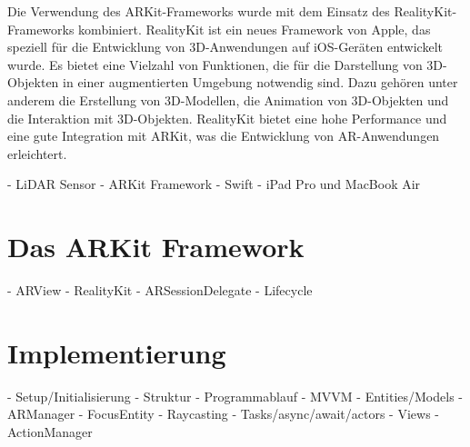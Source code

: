 Die Verwendung des ARKit-Frameworks wurde mit dem Einsatz des RealityKit-Frameworks kombiniert. RealityKit ist ein neues Framework von Apple, das speziell für die Entwicklung von 3D-Anwendungen auf iOS-Geräten entwickelt wurde. Es bietet eine Vielzahl von Funktionen, die für die Darstellung von 3D-Objekten in einer augmentierten Umgebung notwendig sind. Dazu gehören unter anderem die Erstellung von 3D-Modellen, die Animation von 3D-Objekten und die Interaktion mit 3D-Objekten. RealityKit bietet eine hohe Performance und eine gute Integration mit ARKit, was die Entwicklung von AR-Anwendungen erleichtert.

- LiDAR Sensor
- ARKit Framework
- Swift
- iPad Pro und MacBook Air

\section{Das ARKit Framework}
- ARView
- RealityKit
- ARSessionDelegate
- Lifecycle

\section{Implementierung}
- Setup/Initialisierung
- Struktur
- Programmablauf
- MVVM
- Entities/Models
- ARManager
- FocusEntity
- Raycasting
- Tasks/async/await/actors
- Views
- ActionManager